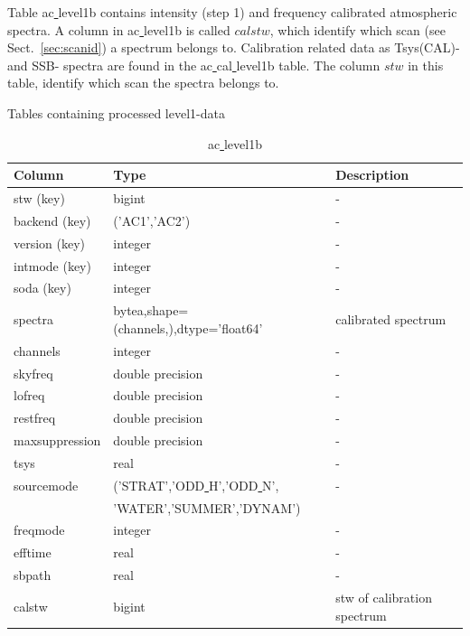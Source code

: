 \documentclass[12pt]{article}
\begin{document}
Table ac\underline{ }level1b contains 
intensity (step 1) and frequency calibrated
atmospheric spectra. A column in ac\underline{ }level1b is called
\(calstw\), which identify which scan (see Sect.~\ref{sec:scanid})
a spectrum belongs to.
Calibration related data as Tsys(CAL)- and SSB- spectra are found 
in the ac\underline{ }cal\underline{ }level1b table. 
The column \(stw\) in this table, identify which scan
the spectra belongs to.


\begin{table}
 \begin{tiny}
     \captionsetup{font=scriptsize}
    \caption{Tables containing processed level1-data}
    \label{table:level1bdata}
    \begin{subtable}{.9\linewidth}
     \captionsetup{font=scriptsize}
      \caption{ac\underline{ }level1b}
       \label{table:ac1b1}
     \centering
\begin{tabular}{l l l}
\hline\hline
Column & Type & Description \\ [0.5ex]
\hline
 stw (key)               & bigint           & - \\
 backend (key)           & ('AC1','AC2')    & -\\
 version (key)            & integer          & -\\         
 intmode (key)           & integer          & -\\
 soda (key)           & integer          & -\\
 spectra            & bytea,shape=(channels,),dtype='float64' & calibrated spectrum\\       
 channels           & integer          & -\\          
 skyfreq            & double precision & -\\ 
 lofreq             & double precision & -\\ 
 restfreq           & double precision & -\\ 
 maxsuppression     & double precision & -\\ 
 tsys               & real             & -\\ 
 sourcemode         & ('STRAT','ODD\underline{ }H','ODD\underline{ }N', & -\\
 & 'WATER','SUMMER','DYNAM') & \\ 
 freqmode           & integer          & -\\ 
 efftime            & real             & -\\ 
 sbpath             & real             & -\\ 
 calstw             & bigint           & stw of calibration spectrum\\[1ex]
\hline
\end{tabular}
\end{subtable}
 \newline
   \newline


\end{tiny}
\end{table}
\end{document}

